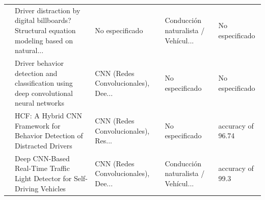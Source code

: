 \begin{table}[htbp]
\begin{tabular}{cp{7.5cm}p{2.8cm}p{2.8cm}p{2.8cm}}
\cite{sheykhfard2020distraction} & Driver distraction by digital billboards? Structural equation modeling based on natural... & No especificado & Conducción naturalista / Vehícul... & No especificado \\
\cite{shahverdy2020behavior} & Driver behavior detection and classification using deep convolutional neural networks & CNN (Redes Convolucionales), Dee... & No especificado & No especificado \\
\cite{huang2020hybrid} & HCF: A Hybrid CNN Framework for Behavior Detection of Distracted Drivers & CNN (Redes Convolucionales), Res... & No especificado & accuracy of 96.74 \\
\cite{ouyang2020deep} & Deep CNN-Based Real-Time Traffic Light Detector for Self-Driving Vehicles & CNN (Redes Convolucionales), Dee... & Conducción naturalista / Vehícul... & accuracy of 99.3 \\
\bottomrule
\end{tabular}
\end{table}




